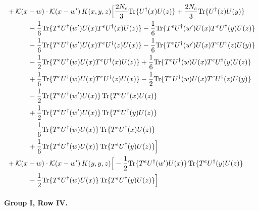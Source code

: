 \documentclass[10pt]{article}
\numberwithin{equation}{section}
\begin{document}
\begin{align}
&+\mathcal K(x-w)\cdot\mathcal K(x-w')\,K(x,y,z)\Big[\frac{2 N_c}{3}{\rm Tr}\{U^\dagger(x)U(z)\}+\frac{2 N_c}{3}{\rm Tr}\{U^\dagger(z)U(y)\}\notag\\
&\quad\quad\quad-\frac{1}{6}{\rm Tr}\{T^eU^\dagger(w')U(x)T^eU^\dagger(x)U(z)\}-\frac{1}{6}{\rm Tr}\{T^eU^\dagger(w')U(x)T^eU^\dagger(y)U(z)\}\notag\\
&\quad\quad\quad-\frac{1}{6}{\rm Tr}\{T^eU^\dagger(w')U(x)T^eU^\dagger(z)U(x)\}-\frac{1}{6}{\rm Tr}\{T^eU^\dagger(w')U(x)T^eU^\dagger(z)U(y)\}\notag\\
&\quad\quad\quad-\frac{1}{2}{\rm Tr}\{T^eU^\dagger(w)U(x)T^eU^\dagger(x)U(z)\}+\frac{1}{6}{\rm Tr}\{T^eU^\dagger(w)U(x)T^eU^\dagger(y)U(z)\}\notag\\
&\quad\quad\quad+\frac{1}{6}{\rm Tr}\{T^eU^\dagger(w)U(x)T^eU^\dagger(z)U(x)\}-\frac{1}{2}{\rm Tr}\{T^eU^\dagger(w)U(x)T^eU^\dagger(z)U(y)\}\notag\\
&\quad\quad\quad-\frac{1}{2}{\rm Tr}\{T^eU^\dagger(w')U(x)\}\,{\rm Tr}\{T^eU^\dagger(x)U(z)\}\notag\\
&\quad\quad\quad+\frac{1}{2}{\rm Tr}\{T^eU^\dagger(w')U(x)\}\,{\rm Tr}\{T^eU^\dagger(y)U(z)\}\notag\\
&\quad\quad\quad-\frac{1}{6}{\rm Tr}\{T^eU^\dagger(w)U(x)\}\,{\rm Tr}\{T^eU^\dagger(x)U(z)\}\notag\\
&\quad\quad\quad+\frac{1}{6}{\rm Tr}\{T^eU^\dagger(w)U(x)\}\,{\rm Tr}\{T^eU^\dagger(y)U(z)\}\Big]\notag\\
&+\mathcal K(x-w)\cdot\mathcal K(x-w')\,K(y,y,z)\Big[-\frac{1}{2}{\rm Tr}\{T^eU^\dagger(w')U(x)\}\,{\rm Tr}\{T^eU^\dagger(y)U(z)\}\notag\\
&\quad\quad\quad-\frac{1}{2}{\rm Tr}\{T^eU^\dagger(w)U(x)\}\,{\rm Tr}\{T^eU^\dagger(y)U(z)\}\Big]
\label{eq:G1III}
\end{align}

\paragraph{Group I, Row IV.}
\end{document}
